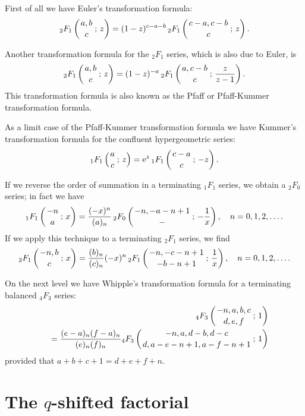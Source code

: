 \documentclass[envcountchap,graybox]{svmono}
\newcommand{\hyp}[5]{\mbox{}_{#1}{F}_{#2}
\left(\genfrac{}{}{0pt}{}{#3}{#4}\,;\,#5\right)}
\newcommand{\e}{\textrm{e}}
\begin{document}
First of all we have Euler's transformation formula:
\begin{equation}
\label{Eulertrans}\index{Euler's transformation formula}
\index{Transformation formula!Euler}
\hyp{2}{1}{a,b}{c}{z}=(1-z)^{c-a-b}\,\hyp{2}{1}{c-a,c-b}{c}{z}.
\end{equation}

Another transformation formula for the ${}_2F_1$ series, which is also due to Euler, is
\begin{equation}
\label{PfaffKummer}\index{Pfaff-Kummer transformation formula}
\index{Transformation formula!Pfaff-Kummer}
\hyp{2}{1}{a,b}{c}{z}=(1-z)^{-a}\,\hyp{2}{1}{a,c-b}{c}{\frac{z}{z-1}}.
\end{equation}
This transformation formula is also known as the Pfaff or Pfaff-Kummer transformation formula.

As a limit case of the Pfaff-Kummer transformation formula we have Kummer's transformation
formula for the confluent hypergeometric series:
\begin{equation}
\label{Kummer}\index{Kummer's transformation formula}\index{Transformation formula!Kummer}
\hyp{1}{1}{a}{c}{z}=\e^z\,\hyp{1}{1}{c-a}{c}{-z}.
\end{equation}

If we reverse the order of summation in a terminating ${}_1F_1$ series, we
obtain a ${}_2F_0$ series; in fact we have
\begin{equation}
\label{reverse1}
\hyp{1}{1}{-n}{a}{x}=\frac{(-x)^n}{(a)_n}\,\hyp{2}{0}{-n,-a-n+1}{-}{-\frac{1}{x}},
\quad n=0,1,2,\ldots.
\end{equation}
If we apply this technique to a terminating ${}_2F_1$ series, we find
\begin{equation}
\label{reverse2}
\hyp{2}{1}{-n,b}{c}{x}=\frac{(b)_n}{(c)_n}(-x)^n\,\hyp{2}{1}{-n,-c-n+1}{-b-n+1}{\frac{1}{x}},
\quad n=0,1,2,\ldots.
\end{equation}

On the next level we have Whipple's transformation formula for a terminating balanced
${}_4F_3$ series:
\begin{eqnarray}
\label{Whipple}\index{Whipple's transformation formula}\index{Transformation formula!Whipple}
& &\hyp{4}{3}{-n,a,b,c}{d,e,f}{1}\nonumber\\
& &{}=\frac{(e-a)_n(f-a)_n}{(e)_n(f)_n}\hyp{4}{3}{-n,a,d-b,d-c}{d,a-e-n+1,a-f-n+1}{1}
\end{eqnarray}
provided that $a+b+c+1=d+e+f+n$.

\section{The $q$-shifted factorial}
\par\setcounter{equation}{0}
\label{qshifted factorial}
\end{document}

